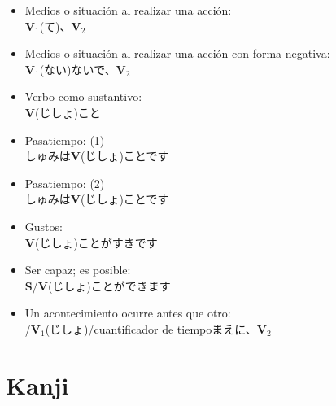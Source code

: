 \documentclass[a4paper,12pt,oneside]{report}
\def\bv{\textbf{V}} %
\def\bs{\textbf{S}} %
\def\vi{$\mathrm{\bv}_1$} %
\def\vn{$\mathrm{\bv}_2$} %
\newenvironment{changemargin}{%
 \begin{list}{}{%
\setlength{\textwidth}{\paperwidth}
\setlength{\textheight}{\paperheight}
   \setlength{\leftmargin}{-0.7in}%
   \setlength{\rightmargin}{0.4in}%
   \setlength{\listparindent}{\parindent}%
   \setlength{\itemindent}{\parindent}%
   \setlength{\parsep}{\parskip}%
 }%
\item[]%
}{\end{list}}
\begin{document}
\begin{CJK*}{UTF8}{min}
\begin{itemize}
          \bv(ない)なくてもいいです
    \item Medios o situación al realizar una acción:\\
          \vi(て)、\vn
    \item Medios o situación al realizar una acción con forma negativa:\\
          \vi(ない)ないで、\vn
    \item Verbo como sustantivo:\\
          \bv(じしょ)こと
    \item Pasatiempo: (1)\\
          しゅみは\bv(じしょ)ことです
    \item Pasatiempo: (2)\\
          しゅみは\bv(じしょ)ことです
    \item Gustos:\\
          \bv(じしょ)ことがすきです
    \item Ser capaz; es posible:\\
          \bs/\bv(じしょ)ことができます
    \item Un acontecimiento ocurre antes que otro:\\
          /\vi(じしょ)/cuantificador de tiempoまえに、\vn
  \end{itemize}


\chapter{Kanji}
  \thispagestyle{contenido} %
  \pagestyle{contenido}     %

\begin{changemargin}

\begin{multicols}{2}


\end{multicols}
\end{changemargin}
\end{CJK*}
\end{document}
